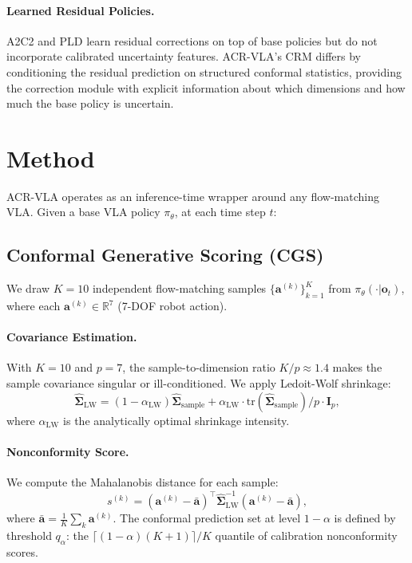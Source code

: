 \documentclass[10pt,twocolumn]{article}
\begin{document}
\paragraph{Learned Residual Policies.}
A2C2 and PLD learn residual corrections on top of base policies but do not incorporate calibrated uncertainty features.
ACR-VLA's CRM differs by conditioning the residual prediction on structured conformal statistics, providing the correction module with explicit information about which dimensions and how much the base policy is uncertain.

\section{Method}
\label{sec:method}

ACR-VLA operates as an inference-time wrapper around any flow-matching VLA. Given a base VLA policy $\pi_\theta$, at each time step $t$:

\subsection{Conformal Generative Scoring (CGS)}
\label{sec:cgs}

We draw $K{=}10$ independent flow-matching samples $\{\mathbf{a}^{(k)}\}_{k=1}^K$ from $\pi_\theta(\cdot | \mathbf{o}_t)$, where each $\mathbf{a}^{(k)} \in \mathbb{R}^7$ (7-DOF robot action).

\paragraph{Covariance Estimation.}
With $K{=}10$ and $p{=}7$, the sample-to-dimension ratio $K/p \approx 1.4$ makes the sample covariance singular or ill-conditioned.
We apply Ledoit-Wolf shrinkage:
\begin{equation}
\hat{\boldsymbol{\Sigma}}_{\mathrm{LW}} = (1 - \alpha_{\mathrm{LW}}) \hat{\boldsymbol{\Sigma}}_{\mathrm{sample}} + \alpha_{\mathrm{LW}} \cdot \mathrm{tr}(\hat{\boldsymbol{\Sigma}}_{\mathrm{sample}})/p \cdot \mathbf{I}_p,
\end{equation}
where $\alpha_{\mathrm{LW}}$ is the analytically optimal shrinkage intensity.

\paragraph{Nonconformity Score.}
We compute the Mahalanobis distance for each sample:
\begin{equation}
s^{(k)} = (\mathbf{a}^{(k)} - \bar{\mathbf{a}})^\top \hat{\boldsymbol{\Sigma}}_{\mathrm{LW}}^{-1} (\mathbf{a}^{(k)} - \bar{\mathbf{a}}),
\end{equation}
where $\bar{\mathbf{a}} = \frac{1}{K}\sum_k \mathbf{a}^{(k)}$.
The conformal prediction set at level $1{-}\alpha$ is defined by threshold $q_\alpha$: the $\lceil(1{-}\alpha)(K{+}1)\rceil/K$ quantile of calibration nonconformity scores.
\end{document}
